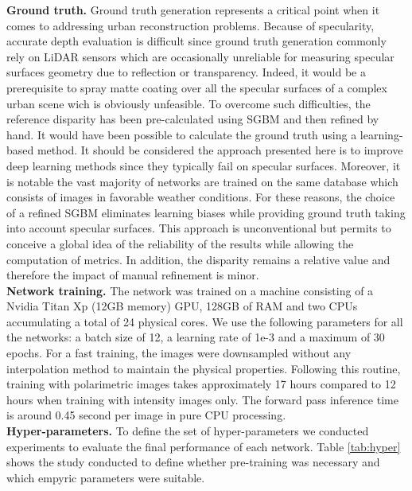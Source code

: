 \textbf{Ground truth. }Ground truth generation represents a critical point when it comes to addressing urban reconstruction problems.  Because of specularity, accurate depth evaluation is difficult since ground truth generation commonly rely on LiDAR sensors which are occasionally unreliable for measuring specular surfaces geometry due to reflection or transparency. Indeed, it would be a prerequisite to spray matte coating over all the specular surfaces of a complex urban scene wich is obviously unfeasible.
To overcome such difficulties, the reference disparity has been pre-calculated using SGBM \cite{hirschmuller2007stereo} and then refined by hand. It would have been possible to calculate the ground truth using a learning-based method. It should be considered the approach presented here is to improve deep learning methods since they typically fail on specular surfaces. Moreover, it is notable the vast majority of networks are trained on the same database which consists of images in favorable weather conditions. For these reasons, the choice of a refined SGBM eliminates learning biases while providing ground truth taking into account specular surfaces. This approach is unconventional but permits to conceive a global idea of the reliability of the results while allowing the computation of metrics. In addition, the disparity remains a relative value and therefore the impact of manual refinement is minor.\\


\textbf{Network training. }The network was trained on a machine consisting of a Nvidia Titan Xp (12GB memory) GPU, 128GB of RAM and two CPUs accumulating a total of 24 physical cores. 
We use the following parameters for all the networks: a batch size of 12, a learning rate of 1e-3 and a maximum of 30 epochs.
For a fast training, the images were downsampled without any interpolation method to maintain the physical properties. 
Following this routine, training with polarimetric images takes approximately 17 hours compared to 12 hours when training with intensity images only. 
The forward pass inference time is around 0.45 second per image in pure CPU processing.\\


\textbf{Hyper-parameters. } To define the set of hyper-parameters we conducted experiments to evaluate the final performance of each network. Table \ref{tab:hyper} shows the study conducted to define whether pre-training was necessary and which empyric parameters were suitable.\\


